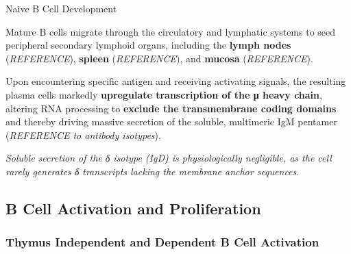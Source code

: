 \begin{core}[label=core:bc_development]{Naive B Cell Development}
\begin{enumerate}[label=(\arabic*)]
          Mature B cells migrate through the circulatory and lymphatic systems to seed peripheral secondary lymphoid organs, including the \textbf{lymph nodes} (\textit{REFERENCE}), \textbf{spleen} (\textit{REFERENCE}), and \textbf{mucosa} (\textit{REFERENCE}).

          Upon encountering specific antigen and receiving activating signals, the resulting plasma cells markedly \textbf{upregulate transcription of the μ heavy chain}, altering RNA processing to \textbf{exclude the transmembrane coding domains} and thereby driving massive secretion of the soluble, multimeric IgM pentamer (\textit{REFERENCE to antibody isotypes}).

          \textit{Soluble secretion of the δ isotype (IgD) is physiologically negligible, as the cell rarely generates δ transcripts lacking the membrane anchor sequences.}

      \end{enumerate}

    \end{core}

  \subsection{B Cell Activation and Proliferation}

    \subsubsection{Thymus Independent and Dependent B Cell Activation}

